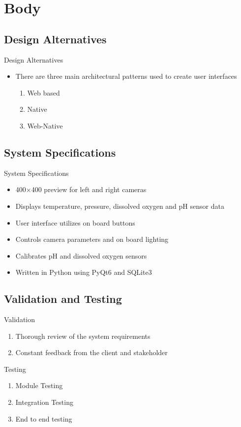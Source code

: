 \documentclass[17pt, aspectratio=169]{beamer}
\begin{document}
\section{Body}
\subsection*{Design Alternatives}
\begin{frame}{Design Alternatives}
	\begin{itemize}

		\item There are three main architectural patterns used to create user interfaces
		      \begin{enumerate}
			      \item Web based
			      \item Native
			      \item Web-Native
		      \end{enumerate}
	\end{itemize}
\end{frame}
\subsection*{System Specifications}
\begin{frame}{System Specifications}
	\begin{itemize}
		\item 400$\times$400 preview for left and right cameras
		\item Displays temperature, pressure, dissolved oxygen and pH sensor data
		\item User interface utilizes on board buttons
		\item Controls camera parameters and on board lighting
		\item Calibrates pH and dissolved oxygen sensors
		\item Written in Python using PyQt6 and SQLite3
	\end{itemize}
\end{frame}
\subsection*{Validation and Testing}
\begin{frame}{Validation}
	\begin{enumerate}
		\item Thorough review of the system requirements
		\item Constant feedback from the client and stakeholder
	\end{enumerate}
\end{frame}
\begin{frame}{Testing}
	\begin{enumerate}
		\item Module Testing
		\item Integration Testing
		\item End to end testing
	\end{enumerate}
\end{frame}
\end{document}
